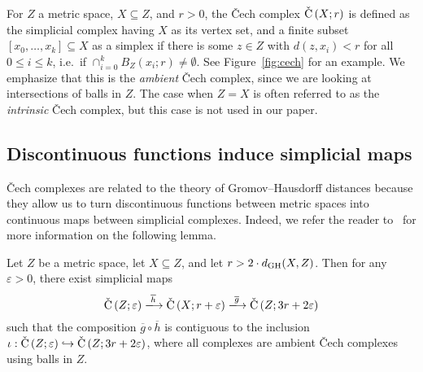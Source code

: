\documentclass[11pt, reqno, english]{amsart}
\newcommand{\og}{\overline{g}}
\newcommand{\oh}{\overline{h}}
\begin{document}
For $Z$ a metric space, $X\subseteq Z$, and $r>0$, the \v{C}ech complex $\mathrm{\check{C}}\left(X;r\right)$ is defined as the simplicial complex having $X$ as its vertex set,
and a finite subset $[x_0,\ldots,x_k]\subseteq X$ as a simplex if there is some $z\in Z$ with $d(z,x_i)<r$ for all $0\leq i\leq k$, i.e.\ if $\cap_{i=0}^k B_Z(x_i;r)\neq \emptyset$.
See Figure~\ref{fig:cech} for an example.
We emphasize that this is the \emph{ambient} \v{C}ech complex, since we are looking at intersections of balls in $Z$.
The case when $Z=X$ is often referred to as the \emph{intrinsic} \v{C}ech complex, but this case is not used in our paper.


\subsection*{Discontinuous functions induce simplicial maps}

\v{C}ech complexes are related to the theory of Gromov--Hausdorff distances because they allow us to turn discontinuous functions between metric spaces into continuous maps between simplicial complexes.
Indeed, we refer the reader to~\cite{ChazalDeSilvaOudot2014} for more information on the following lemma.

\vspace{3mm}
\begin{lemma}
\label{lem:correspondence-cech}
Let $Z$ be a metric space, let $X\subseteq Z$, and let $r > 2\cdot d_{\mathrm{GH}}(X,Z)$.
Then for any $\varepsilon > 0$, there exist simplicial maps
\[\cech{Z}{\varepsilon} \xlongrightarrow{\oh} \cech{X}{r+\varepsilon}
\xlongrightarrow{\og} \cech{Z}{3r+2\varepsilon}\]
such that the composition
$\og\circ\oh$ is contiguous to the inclusion
$\iota:\mathrm{\check{C}}\left(Z;\varepsilon\right)\hookrightarrow\mathrm{\check{C}}\left(Z;3r+2\varepsilon\right)$, where all complexes are ambient \v{C}ech complexes using balls in $Z$.
\end{lemma}
\vspace{3mm}
\end{document}
